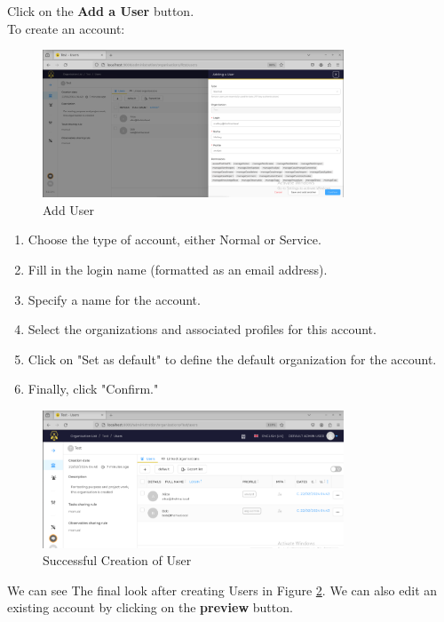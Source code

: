 \documentclass{article}
\begin{document}
Click on the \textbf{Add a User} button. \\
To create an account:\\
\begin{figure}[h!]
    \centering
    \includegraphics[width=0.8\textwidth]{img4.png}
    \caption{Add User}
    \label{fig:add}
\end{figure}



\begin{enumerate}
  \item Choose the type of account, either Normal or Service.
  \item Fill in the login name (formatted as an email address).
  \item Specify a name for the account.
  \item Select the organizations and associated profiles for this account.
  \item Click on "Set as default" to define the default organization for the account.
  \item Finally, click "Confirm."
\end{enumerate}
\begin{figure}[h!]
    \centering
    \includegraphics[width=0.8\textwidth]{img5.png}
    \caption{Successful Creation of User}
    \label{fig:add}
\end{figure}

We can see The final look after creating Users in Figure \ref{fig:add}.
We can also edit an existing account by clicking on the \textbf{preview} button. \\
\end{document}
